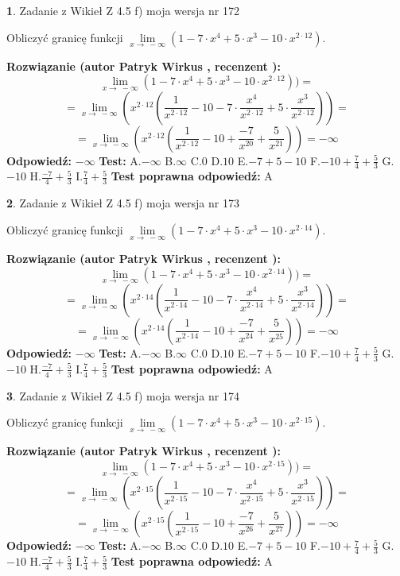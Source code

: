 \documentclass[12pt, a4paper]{article}
\theoremstyle{definition} %
\newtheorem{zad}{}
\newcommand{\zadStart}[1]{\begin{zad}#1\newline}
\newcommand{\zadStop}{\end{zad}}
\newcommand{\rozwStart}[2]{\noindent \textbf{Rozwiązanie (autor #1 , recenzent #2): }\newline}
\newcommand{\rozwStop}{\newline}
\newcommand{\odpStart}{\noindent \textbf{Odpowiedź:}\newline}
\newcommand{\odpStop}{\newline}
\newcommand{\testStart}{\noindent \textbf{Test:}\newline}
\newcommand{\testStop}{\newline}
\newcommand{\kluczStart}{\noindent \textbf{Test poprawna odpowiedź:}\newline}
\newcommand{\kluczStop}{\newline}
\begin{document}
\zadStart{Zadanie z Wikieł Z 4.5 f) moja wersja nr 172}



Obliczyć granicę funkcji  $\lim\limits_{x\to\ -\infty}(1 - 7 \cdot x^{4}+5 \cdot x^{3}- 10 \cdot x^{2\cdot12})$.
\zadStop
\rozwStart{Patryk Wirkus}{}
$$\lim\limits_{x\to\ -\infty}(1 - 7 \cdot x^{4}+5 \cdot x^{3}- 10 \cdot x^{2\cdot12}))=$$
$$=\lim\limits_{x\to\ -\infty}(x^{2\cdot12}(\frac{1}{x^{2\cdot12}}-10 -7 \cdot \frac{x^{4}}{x^{2\cdot12}}+5 \cdot \frac{x^{3}}{x^{2\cdot12}}))=$$
$$=\lim\limits_{x\to\ -\infty}(x^{2\cdot12}(\frac{1}{x^{2\cdot12}}-10 + \frac{-7}{x^{20}}+ \frac{5}{x^{21}}))=-\infty$$
\rozwStop
\odpStart
$-\infty$
\odpStop
\testStart
A.$-\infty$ B.$\infty$ C.$0$ D.$10$ E.$-7 + 5 - 10$
F.$-10+\frac{7}{4}+\frac{5}{3}$ G.$-10$
H.$\frac{-7}{4}+\frac{5}{3}$
I.$\frac{7}{4}+\frac{5}{3}$
\testStop
\kluczStart
A
\kluczStop



\zadStart{Zadanie z Wikieł Z 4.5 f) moja wersja nr 173}



Obliczyć granicę funkcji  $\lim\limits_{x\to\ -\infty}(1 - 7 \cdot x^{4}+5 \cdot x^{3}- 10 \cdot x^{2\cdot14})$.
\zadStop
\rozwStart{Patryk Wirkus}{}
$$\lim\limits_{x\to\ -\infty}(1 - 7 \cdot x^{4}+5 \cdot x^{3}- 10 \cdot x^{2\cdot14}))=$$
$$=\lim\limits_{x\to\ -\infty}(x^{2\cdot14}(\frac{1}{x^{2\cdot14}}-10 -7 \cdot \frac{x^{4}}{x^{2\cdot14}}+5 \cdot \frac{x^{3}}{x^{2\cdot14}}))=$$
$$=\lim\limits_{x\to\ -\infty}(x^{2\cdot14}(\frac{1}{x^{2\cdot14}}-10 + \frac{-7}{x^{24}}+ \frac{5}{x^{25}}))=-\infty$$
\rozwStop
\odpStart
$-\infty$
\odpStop
\testStart
A.$-\infty$ B.$\infty$ C.$0$ D.$10$ E.$-7 + 5 - 10$
F.$-10+\frac{7}{4}+\frac{5}{3}$ G.$-10$
H.$\frac{-7}{4}+\frac{5}{3}$
I.$\frac{7}{4}+\frac{5}{3}$
\testStop
\kluczStart
A
\kluczStop



\zadStart{Zadanie z Wikieł Z 4.5 f) moja wersja nr 174}



Obliczyć granicę funkcji  $\lim\limits_{x\to\ -\infty}(1 - 7 \cdot x^{4}+5 \cdot x^{3}- 10 \cdot x^{2\cdot15})$.
\zadStop
\rozwStart{Patryk Wirkus}{}
$$\lim\limits_{x\to\ -\infty}(1 - 7 \cdot x^{4}+5 \cdot x^{3}- 10 \cdot x^{2\cdot15}))=$$
$$=\lim\limits_{x\to\ -\infty}(x^{2\cdot15}(\frac{1}{x^{2\cdot15}}-10 -7 \cdot \frac{x^{4}}{x^{2\cdot15}}+5 \cdot \frac{x^{3}}{x^{2\cdot15}}))=$$
$$=\lim\limits_{x\to\ -\infty}(x^{2\cdot15}(\frac{1}{x^{2\cdot15}}-10 + \frac{-7}{x^{26}}+ \frac{5}{x^{27}}))=-\infty$$
\rozwStop
\odpStart
$-\infty$
\odpStop
\testStart
A.$-\infty$ B.$\infty$ C.$0$ D.$10$ E.$-7 + 5 - 10$
F.$-10+\frac{7}{4}+\frac{5}{3}$ G.$-10$
H.$\frac{-7}{4}+\frac{5}{3}$
I.$\frac{7}{4}+\frac{5}{3}$
\testStop
\kluczStart
A
\kluczStop
\end{document}
